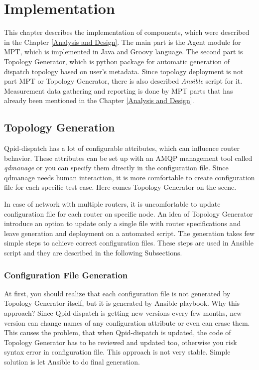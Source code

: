 \chapter{Implementation}
\label{Implementation}
This chapter describes the implementation of components, which were described in the Chapter \ref{Analysis and Design}. The main part is the Agent module for MPT, which is implemented in Java and Groovy language. The second part is Topology Generator, which is python package for automatic generation of dispatch topology based on user's metadata. Since topology deployment is not part MPT or Topology Generator, there is also described \emph{Ansible} script for it. Measurement data gathering and reporting is done by MPT parts that has already been mentioned in the Chapter \ref{Analysis and Design}.

\section{Topology Generation}
Qpid-dispatch has a lot of configurable attributes, which can influence router behavior. These attributes can be set up with an AMQP management tool called \emph{qdmanage}\footnotemark{} or you can specify them directly in the configuration file. Since qdmanage needs human interaction, it is more comfortable to create configuration file for each specific test case. Here comes Topology Generator on the scene.


In case of network with multiple routers, it is uncomfortable to update configuration file for each router on specific node. An idea of Topology Generator introduce an option to update only a single file with router specifications and leave generation and deployment on a automated script. The generation takes few simple steps to achieve correct configuration files. These steps are used in Ansible script and they are described in the following Subsections.

\subsection{Configuration File Generation}
At first, you should realize that each configuration file is not generated by Topology Generator itself, but it is generated by Ansible playbook. Why this approach? Since Qpid-dispatch is getting new versions every few months, new version can change names of any configuration attribute or even can erase them. This causes the problem, that when Qpid-dispatch is updated, the code of Topology Generator has to be reviewed and updated too, otherwise you risk syntax error in configuration file. This approach is not very stable. Simple solution is let Ansible to do final generation.

